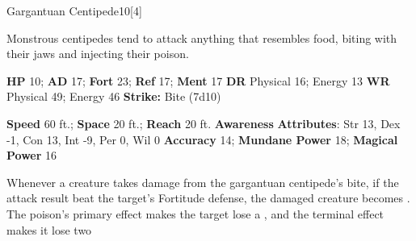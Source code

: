  
  \begin{monsection}{Gargantuan Centipede}{10}[4]
    \vspace{-1em}\vspace{-1em}
    \vspace{0em}

    
    Monstrous centipedes tend to attack anything that resembles food, biting with their jaws and injecting their poison.
  

    \begin{spellcontent}
      \begin{spelltargetinginfo}
        \pari \textbf{HP} 10;
          \textbf{AD} 17;
          \textbf{Fort} 23;
          \textbf{Ref} 17;
          \textbf{Ment} 17
        \pari \textbf{DR} Physical 16; Energy 13
        \pari \textbf{WR} Physical 49; Energy 46
        \pari \textbf{Strike:}
            Bite  (7d10)
      \end{spelltargetinginfo}
    \end{spellcontent}
    \begin{monsterfooter}
      \pari \textbf{Speed} 60 ft.;
        \textbf{Space} 20 ft.;
        \textbf{Reach} 20 ft.
      \pari \textbf{Awareness} 
      \pari \textbf{Attributes}:
        Str 13, Dex -1,
        Con 13, Int -9,
        Per 0, Wil 0
      \pari \textbf{Accuracy} 14;
        \textbf{Mundane Power} 18;
      \textbf{Magical Power} 16
    \end{monsterfooter}
  \end{monsection}
    Whenever a creature takes damage from the gargantuan centipede's bite,
      if the attack result beat the target's Fortitude defense,
      the damaged creature becomes .
    The poison's primary effect makes the target lose a , and the terminal effect makes it lose two 
  
